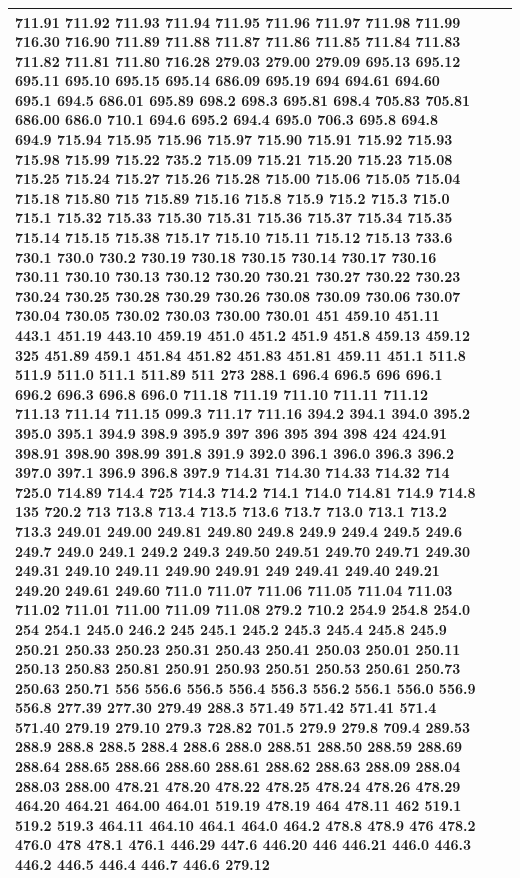 \documentclass[3p,super,numbers,sort&compress,preprint,10pt]{elsarticle}
\begin{document}
\begin{longtable}{|L{.1in}|L{.6in}||L{5.65in}|}
711.91 711.92 711.93 711.94 711.95 711.96 711.97 711.98 711.99 716.30 716.90 711.89 711.88 711.87 711.86 711.85 711.84 711.83 711.82 711.81 711.80 716.28 279.03 279.00 279.09 695.13 695.12 695.11 695.10 695.15 695.14 686.09 695.19 694 694.61 694.60 695.1 694.5 686.01 695.89 698.2 698.3 695.81 698.4 705.83 705.81 686.00 686.0 710.1 694.6 695.2 694.4 695.0 706.3 695.8 694.8 694.9 715.94 715.95 715.96 715.97 715.90 715.91 715.92 715.93 715.98 715.99 715.22 735.2 715.09 715.21 715.20 715.23 715.08 715.25 715.24 715.27 715.26 715.28 715.00 715.06 715.05 715.04 715.18 715.80 715 715.89 715.16 715.8 715.9 715.2 715.3 715.0 715.1 715.32 715.33 715.30 715.31 715.36 715.37 715.34 715.35 715.14 715.15 715.38 715.17 715.10 715.11 715.12 715.13 733.6 730.1 730.0 730.2 730.19 730.18 730.15 730.14 730.17 730.16 730.11 730.10 730.13 730.12 730.20 730.21 730.27 730.22 730.23 730.24 730.25 730.28 730.29 730.26 730.08 730.09 730.06 730.07 730.04 730.05 730.02 730.03 730.00 730.01 451 459.10 451.11 443.1 451.19 443.10 459.19 451.0 451.2 451.9 451.8 459.13 459.12 325 451.89 459.1 451.84 451.82 451.83 451.81 459.11 451.1 511.8 511.9 511.0 511.1 511.89 511 273 288.1 696.4 696.5 696 696.1 696.2 696.3 696.8 696.0 711.18 711.19 711.10 711.11 711.12 711.13 711.14 711.15 099.3 711.17 711.16 394.2 394.1 394.0 395.2 395.0 395.1 394.9 398.9 395.9 397 396 395 394 398 424 424.91 398.91 398.90 398.99 391.8 391.9 392.0 396.1 396.0 396.3 396.2 397.0 397.1 396.9 396.8 397.9 714.31 714.30 714.33 714.32 714 725.0 714.89 714.4 725 714.3 714.2 714.1 714.0 714.81 714.9 714.8 135 720.2 713 713.8 713.4 713.5 713.6 713.7 713.0 713.1 713.2 713.3 249.01 249.00 249.81 249.80 249.8 249.9 249.4 249.5 249.6 249.7 249.0 249.1 249.2 249.3 249.50 249.51 249.70 249.71 249.30 249.31 249.10 249.11 249.90 249.91 249 249.41 249.40 249.21 249.20 249.61 249.60 711.0 711.07 711.06 711.05 711.04 711.03 711.02 711.01 711.00 711.09 711.08 279.2 710.2 254.9 254.8 254.0 254 254.1 245.0 246.2 245 245.1 245.2 245.3 245.4 245.8 245.9 250.21 250.33 250.23 250.31 250.43 250.41 250.03 250.01 250.11 250.13 250.83 250.81 250.91 250.93 250.51 250.53 250.61 250.73 250.63 250.71 556 556.6 556.5 556.4 556.3 556.2 556.1 556.0 556.9 556.8 277.39 277.30 279.49 288.3 571.49 571.42 571.41 571.4 571.40 279.19 279.10 279.3 728.82 701.5 279.9 279.8 709.4 289.53 288.9 288.8 288.5 288.4 288.6 288.0 288.51 288.50 288.59 288.69 288.64 288.65 288.66 288.60 288.61 288.62 288.63 288.09 288.04 288.03 288.00 478.21 478.20 478.22 478.25 478.24 478.26 478.29 464.20 464.21 464.00 464.01 519.19 478.19 464 478.11 462 519.1 519.2 519.3 464.11 464.10 464.1 464.0 464.2 478.8 478.9 476 478.2 476.0 478 478.1 476.1 446.29 447.6 446.20 446 446.21 446.0 446.3 446.2 446.5 446.4 446.7 446.6 279.12\\\hline

\end{longtable}
\end{document}
